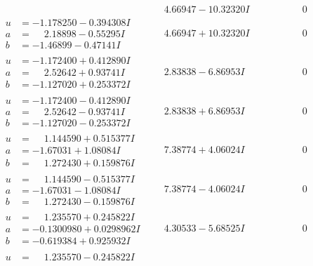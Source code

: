\documentclass[1p]{elsarticle_modified}
\theoremstyle{definition}
\begin{document}
$$\begin{array}{c|c|c}
 & \phantom{-}4.66947 - 10.32320 I & \phantom{-0.000000 } 0 \\ \hline\begin{aligned}
u &= -1.178250 - 0.394308 I \\
a &= \phantom{-}2.18898 - 0.55295 I \\
b &= -1.46899 - 0.47141 I\end{aligned}
 & \phantom{-}4.66947 + 10.32320 I & \phantom{-0.000000 } 0 \\ \hline\begin{aligned}
u &= -1.172400 + 0.412890 I \\
a &= \phantom{-}2.52642 + 0.93741 I \\
b &= -1.127020 + 0.253372 I\end{aligned}
 & \phantom{-}2.83838 - 6.86953 I & \phantom{-0.000000 } 0 \\ \hline\begin{aligned}
u &= -1.172400 - 0.412890 I \\
a &= \phantom{-}2.52642 - 0.93741 I \\
b &= -1.127020 - 0.253372 I\end{aligned}
 & \phantom{-}2.83838 + 6.86953 I & \phantom{-0.000000 } 0 \\ \hline\begin{aligned}
u &= \phantom{-}1.144590 + 0.515377 I \\
a &= -1.67031 + 1.08084 I \\
b &= \phantom{-}1.272430 + 0.159876 I\end{aligned}
 & \phantom{-}7.38774 + 4.06024 I & \phantom{-0.000000 } 0 \\ \hline\begin{aligned}
u &= \phantom{-}1.144590 - 0.515377 I \\
a &= -1.67031 - 1.08084 I \\
b &= \phantom{-}1.272430 - 0.159876 I\end{aligned}
 & \phantom{-}7.38774 - 4.06024 I & \phantom{-0.000000 } 0 \\ \hline\begin{aligned}
u &= \phantom{-}1.235570 + 0.245822 I \\
a &= -0.1300980 + 0.0298962 I \\
b &= -0.619384 + 0.925932 I\end{aligned}
 & \phantom{-}4.30533 - 5.68525 I & \phantom{-0.000000 } 0 \\ \hline\begin{aligned}
u &= \phantom{-}1.235570 - 0.245822 I \\

\end{aligned}
\end{array}$$
\end{document}
